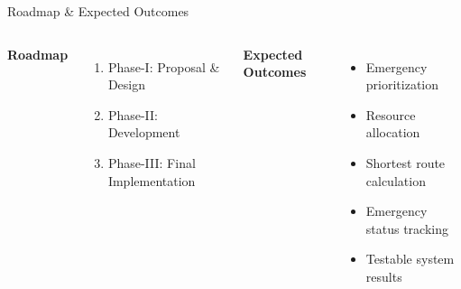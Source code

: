 \documentclass[aspectratio=169,11pt]{beamer}
\begin{document}

\begin{frame}{Roadmap \& Expected Outcomes}

\begin{columns}[T,totalwidth=\textwidth]


\textbf{\color{GEUBlue}Roadmap}

\begin{enumerate}
\itemsep3pt

\item Phase-I: Proposal \& Design
\item Phase-II: Development
\item Phase-III: Final Implementation

\end{enumerate}


\vspace{2mm}

\textbf{\color{GEUBlue}Expected Outcomes}

\begin{itemize}
\itemsep2pt

\item Emergency prioritization
\item Resource allocation
\item Shortest route calculation
\item Emergency status tracking
\item Testable system results

\end{itemize}

\end{columns}

\end{frame}


\end{document}
